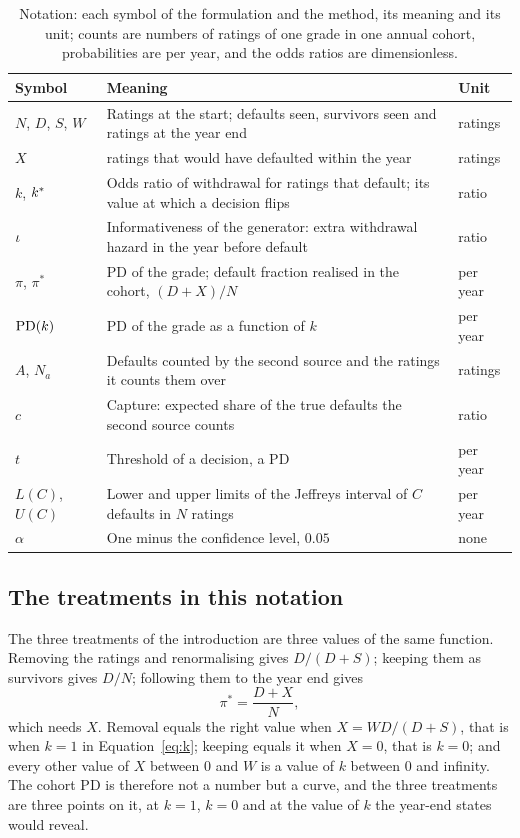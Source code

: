 \begin{table}[htbp]
\centering
\small
\caption{Notation: each symbol of the formulation and the method, its meaning and its unit; counts are numbers of ratings of one grade in one annual cohort, probabilities are per year, and the odds ratios are dimensionless.}
\label{tab:notation}
\begin{tabularx}{\textwidth}{lXl}
\toprule
Symbol & Meaning & Unit \\
\midrule
$N$, $D$, $S$, $W$ & Ratings at the start; defaults seen, survivors seen and \wdn{} ratings at the year end & ratings \\
$X$ & \wdn{} ratings that would have defaulted within the year & ratings \\
$k$, $k^{*}$ & Odds ratio of withdrawal for ratings that default; its value at which a decision flips & ratio \\
$\iota$ & Informativeness of the generator: extra withdrawal hazard in the year before default & ratio \\
$\pi$, $\pi^{\ast}$ & PD of the grade; default fraction realised in the cohort, $(D+X)/N$ & per year \\
$\mathrm{PD}(k)$ & PD of the grade as a function of $k$ & per year \\
$A$, $N_a$ & Defaults counted by the second source and the ratings it counts them over & ratings \\
$c$ & Capture: expected share of the true defaults the second source counts & ratio \\
$t$ & Threshold of a decision, a PD & per year \\
$L(C)$, $U(C)$ & Lower and upper limits of the Jeffreys interval of $C$ defaults in $N$ ratings & per year \\
$\alpha$ & One minus the confidence level, $0.05$ & none \\
\bottomrule
\end{tabularx}
\end{table}

\subsection{The treatments in this notation}

The three treatments of the introduction are three values of the same function. Removing the \wdn{} ratings and renormalising gives $D/(D+S)$; keeping them as survivors gives $D/N$; following them to the year end gives
\begin{equation}
\pi^{\ast}=\frac{D+X}{N},
\label{eq:followed}
\end{equation}
which needs $X$. Removal equals the right value when $X=WD/(D+S)$, that is when $k=1$ in Equation~\eqref{eq:k}; keeping equals it when $X=0$, that is $k=0$; and every other value of $X$ between $0$ and $W$ is a value of $k$ between $0$ and infinity. The cohort PD is therefore not a number but a curve, and the three treatments are three points on it, at $k=1$, $k=0$ and at the value of $k$ the year-end states would reveal.

